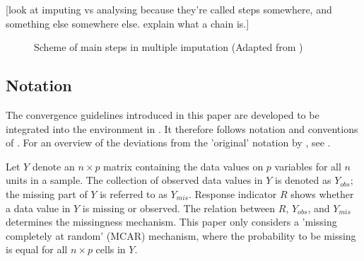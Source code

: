 \documentclass[article]{jss}
\begin{document}
[look at imputing vs analysing because they're called steps somewhere, and something else somewhere else. explain what a chain is.]

\begin{figure}
\centering
	\large{}
\caption{Scheme of main steps in multiple imputation (Adapted from \cite[\S~1.4.1]{buur18})}
\end{figure}




\subsection{Notation} \label{sec:notation}

The convergence guidelines introduced in this paper are developed to be integrated into the  environment \citep{mice} in  \citep{R}. It therefore follows notation and conventions of \cite{mice}. For an overview of the deviations from the 'original' notation by \cite{rubin87}, see \cite{buur18}. 

Let $Y$ denote an $n \times p$ matrix containing the data values on $p$ variables for all $n$ units in a sample. The collection of observed data values in $Y$ is denoted as $Y_{obs}$; the missing part of $Y$ is referred to as $Y_{mis}$. Response indicator $R$ shows whether a data value in $Y$ is missing or observed. The relation between $R$, $Y_{obs}$, and $Y_{mis}$ determines the missingness mechanism. This paper only considers a 'missing completely at random' (MCAR) mechanism, where the probability to be missing is equal for all $n \times p$ cells in $Y$.
\end{document}
